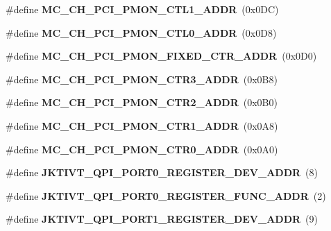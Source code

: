 \begin{DoxyCompactItemize}
\item 
\#define {\bfseries M\+C\+\_\+\+C\+H\+\_\+\+P\+C\+I\+\_\+\+P\+M\+O\+N\+\_\+\+C\+T\+L1\+\_\+\+A\+D\+D\+R}~(0x0\+D\+C)\label{types_8h_ae59d81ac1c32f8eb29851c22db9f15ba}

\item 
\#define {\bfseries M\+C\+\_\+\+C\+H\+\_\+\+P\+C\+I\+\_\+\+P\+M\+O\+N\+\_\+\+C\+T\+L0\+\_\+\+A\+D\+D\+R}~(0x0\+D8)\label{types_8h_ada8a1223bd0e2186680368008ab38bf9}

\item 
\#define {\bfseries M\+C\+\_\+\+C\+H\+\_\+\+P\+C\+I\+\_\+\+P\+M\+O\+N\+\_\+\+F\+I\+X\+E\+D\+\_\+\+C\+T\+R\+\_\+\+A\+D\+D\+R}~(0x0\+D0)\label{types_8h_a36010efef77b77099bda236928350765}

\item 
\#define {\bfseries M\+C\+\_\+\+C\+H\+\_\+\+P\+C\+I\+\_\+\+P\+M\+O\+N\+\_\+\+C\+T\+R3\+\_\+\+A\+D\+D\+R}~(0x0\+B8)\label{types_8h_a9bc0da0ea219da7342758080e2b2b923}

\item 
\#define {\bfseries M\+C\+\_\+\+C\+H\+\_\+\+P\+C\+I\+\_\+\+P\+M\+O\+N\+\_\+\+C\+T\+R2\+\_\+\+A\+D\+D\+R}~(0x0\+B0)\label{types_8h_ac3febfd1f0b8c18039b82c218830cef4}

\item 
\#define {\bfseries M\+C\+\_\+\+C\+H\+\_\+\+P\+C\+I\+\_\+\+P\+M\+O\+N\+\_\+\+C\+T\+R1\+\_\+\+A\+D\+D\+R}~(0x0\+A8)\label{types_8h_a543a917251e68c9b645ad13bcba71efa}

\item 
\#define {\bfseries M\+C\+\_\+\+C\+H\+\_\+\+P\+C\+I\+\_\+\+P\+M\+O\+N\+\_\+\+C\+T\+R0\+\_\+\+A\+D\+D\+R}~(0x0\+A0)\label{types_8h_aade8692522b0bb5c8f271af605b2043a}

\item 
\#define {\bfseries J\+K\+T\+I\+V\+T\+\_\+\+Q\+P\+I\+\_\+\+P\+O\+R\+T0\+\_\+\+R\+E\+G\+I\+S\+T\+E\+R\+\_\+\+D\+E\+V\+\_\+\+A\+D\+D\+R}~(8)\label{types_8h_a624a8b9595c387aae5603f38edf2e3fd}

\item 
\#define {\bfseries J\+K\+T\+I\+V\+T\+\_\+\+Q\+P\+I\+\_\+\+P\+O\+R\+T0\+\_\+\+R\+E\+G\+I\+S\+T\+E\+R\+\_\+\+F\+U\+N\+C\+\_\+\+A\+D\+D\+R}~(2)\label{types_8h_ae7ea5cfb57b8685a1c7d448f47aade95}

\item 
\#define {\bfseries J\+K\+T\+I\+V\+T\+\_\+\+Q\+P\+I\+\_\+\+P\+O\+R\+T1\+\_\+\+R\+E\+G\+I\+S\+T\+E\+R\+\_\+\+D\+E\+V\+\_\+\+A\+D\+D\+R}~(9)\label{types_8h_ae6e90624a2ad5e3a2296316203f12671}


\end{DoxyCompactItemize}
